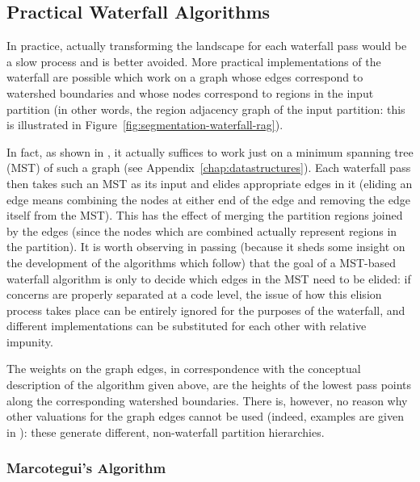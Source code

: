
\subsection{Practical Waterfall Algorithms}

In practice, actually transforming the landscape for each waterfall pass would be a slow process and is better avoided. More practical implementations of the waterfall are possible which work on a graph whose edges correspond to watershed boundaries and whose nodes correspond to regions in the input partition (in other words, the region adjacency graph of the input partition: this is illustrated in Figure~\ref{fig:segmentation-waterfall-rag}).


In fact, as shown in \cite{marcotegui05}, it actually suffices to work just on a minimum spanning tree (MST) of such a graph (see Appendix~\ref{chap:datastructures}). Each waterfall pass then takes such an MST as its input and elides appropriate edges in it (eliding an edge means combining the nodes at either end of the edge and removing the edge itself from the MST). This has the effect of merging the partition regions joined by the edges (since the nodes which are combined actually represent regions in the partition). It is worth observing in passing (because it sheds some insight on the development of the algorithms which follow) that the goal of a MST-based waterfall algorithm is only to decide which edges in the MST need to be elided: if concerns are properly separated at a code level, the issue of how this elision process takes place can be entirely ignored for the purposes of the waterfall, and different implementations can be substituted for each other with relative impunity.

The weights on the graph edges, in correspondence with the conceptual description of the algorithm given above, are the heights of the lowest pass points along the corresponding watershed boundaries. There is, however, no reason why other valuations for the graph edges cannot be used (indeed, examples are given in \cite{marcotegui05}): these generate different, non-waterfall partition hierarchies.

\subsubsection{Marcotegui's Algorithm}

